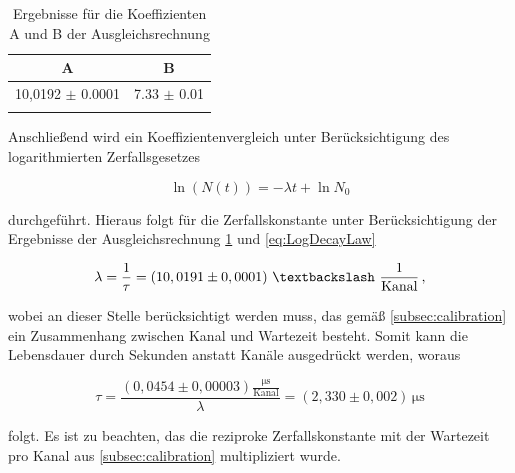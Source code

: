 \begin{table}[h!]
  \centering
\begin{tabular}{cc} \toprule
A   & B  \\ \midrule
10,0192 $\pm$ 0.0001 & 7.33 $\pm$ 0.01 \\
\bottomrule
\label{tab:Fit}
\end{tabular}
\caption{Ergebnisse für die Koeffizienten A und B der Ausgleichsrechnung}
\end{table}

Anschließend wird ein Koeffizientenvergleich unter Berücksichtigung des logarithmierten Zerfallsgesetzes

\begin{equation}
\ln(N(t)) = -\lambda t + \ln{N_0}
\label{eq:LogDecayLaw}
\end{equation}

\noindent durchgeführt. Hieraus folgt für die Zerfallskonstante unter Berücksichtigung der Ergebnisse der Ausgleichsrechnung \ref{tab:Fit} und \ref{eq:LogDecayLaw}

\begin{equation}
\lambda = \frac{1}{\tau} = (10,0191 \pm 0,0001) \,\, \textbackslash \,\, \frac{1}{\text{Kanal}}\,,
\end{equation}

\noindent wobei an dieser Stelle berücksichtigt werden muss, das gemäß \ref{subsec:calibration} ein Zusammenhang zwischen Kanal und Wartezeit besteht. Somit kann
die Lebensdauer durch Sekunden anstatt Kanäle ausgedrückt werden, woraus

\begin{equation}
\tau = \frac{(0,0454 \pm 0,00003) \frac{\si{\micro\second}}{\text{Kanal}}}{\lambda} = (2,330 \pm 0,002) \, \si{\micro\second}
\end{equation}

\noindent folgt. Es ist zu beachten, das die reziproke Zerfallskonstante mit der Wartezeit pro Kanal aus \ref{subsec:calibration} multipliziert wurde.
